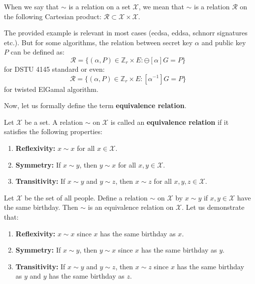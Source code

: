 \documentclass[../lecture-notes.tex]{subfiles}
\begin{document}
\begin{remark}
    When we say that $\sim$ is a relation on a set $\mathcal{X}$, we mean that $\sim$ is a relation $\mathcal{R}$ on the following Cartesian product: $\mathcal{R} \subset \mathcal{X} \times \mathcal{X}$.
\end{remark}

\begin{remark}
    The provided example is relevant in most cases (ecdsa, eddsa, schnorr signatures etc.). But for some algorithms, the relation between secret key $\alpha$ and public key $P$ can be defined as:
    \begin{equation}
        \mathcal{R} = \{(\alpha, P) \in \mathbb{Z}_r \times E: \ominus[\alpha]G = P\}
    \end{equation} 
    for DSTU 4145 standard or even:
    \begin{equation}
        \mathcal{R} = \{(\alpha, P) \in \mathbb{Z}_r \times E: [\alpha^{-1}]G = P\}
    \end{equation}
    for twisted ElGamal algorithm.
\end{remark}

Now, let us formally define the term \textbf{equivalence relation}.

\begin{definition}
    Let $\mathcal{X}$ be a set. A relation $\sim$ on $\mathcal{X}$ is called an \textbf{equivalence relation} if it satisfies the following properties:
    \begin{enumerate}
        \item \textbf{Reflexivity:} $x \sim x$ for all $x \in \mathcal{X}$.
        \item \textbf{Symmetry:} If $x \sim y$, then $y \sim x$ for all $x,y \in \mathcal{X}$.
        \item \textbf{Transitivity:} If $x \sim y$ and $y \sim z$, then $x \sim z$ for all $x,y,z \in \mathcal{X}$.
    \end{enumerate}
\end{definition}

\begin{example}
    Let $\mathcal{X}$ be the set of all people. Define a relation $\sim$ on $\mathcal{X}$ by $x \sim y$ if $x,y \in \mathcal{X}$ have the same birthday. 
    Then $\sim$ is an equivalence relation on $\mathcal{X}$. Let us demonstrate that:
    \begin{enumerate}
        \item \textbf{Reflexivity:} $x \sim x$ since $x$ has the same birthday as $x$.
        \item \textbf{Symmetry:} If $x \sim y$, then $y \sim x$ since $x$ has the same birthday as $y$.
        \item \textbf{Transitivity:} If $x \sim y$ and $y \sim z$, then $x \sim z$ since $x$ has the same birthday as $y$ and $y$ has the same birthday as $z$.
    \end{enumerate}
\end{example}
\end{document}
